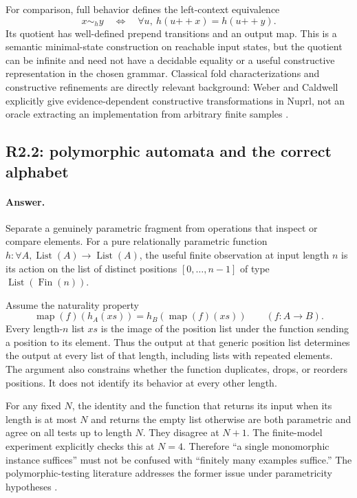 \documentclass[11pt,a4paper]{article}
\newcommand{\Fin}{\operatorname{Fin}}
\newcommand{\answer}{\paragraph{Answer.}}
\theoremstyle{definition}
\theoremstyle{remark}
\begin{document}
For comparison, full behavior defines the left-context equivalence
\[
 x\sim_h y\quad\Longleftrightarrow\quad
   \forall u,\ h(u\mathbin{++}x)=h(u\mathbin{++}y).
\]
Its quotient has well-defined prepend transitions and an output map. This is a
semantic minimal-state construction on reachable input states, but the quotient
can be infinite and need not have a decidable equality or a useful constructive
representation in the chosen grammar. Classical fold characterizations and
constructive refinements are directly relevant background: Weber and Caldwell
explicitly give evidence-dependent constructive transformations in Nuprl, not
an oracle extracting an implementation from arbitrary finite samples
\cite{gibbons,weber}.

\subsection{R2.2: polymorphic automata and the correct alphabet}
\answer Separate a genuinely parametric fragment from operations that inspect
or compare elements. For a pure relationally parametric function
$h:\forall A,\operatorname{List}(A)\to\operatorname{List}(A)$, the useful finite
observation at input length $n$ is its action on the list of distinct positions
$[0,\ldots,n-1]$ of type $\operatorname{List}(\Fin(n))$.

Assume the naturality property
\begin{equation}\label{eq:naturality}
 \operatorname{map}(f)(h_A(xs))
 =h_B(\operatorname{map}(f)(xs))
 \qquad(f:A\to B).
\end{equation}
Every length-$n$ list $xs$ is the image of the position list under the function
sending a position to its element. Thus the output at that generic position list
determines the output at every list of that length, including lists with repeated
elements. The argument also constrains whether the function duplicates, drops,
or reorders positions. It does not identify its behavior at every other length.

For any fixed $N$, the identity and the function that returns its input when
its length is at most $N$ and returns the empty list otherwise are both
parametric and agree on all tests up to length $N$. They disagree at $N+1$.
The finite-model experiment explicitly checks this at $N=4$. Therefore ``a
single monomorphic instance suffices'' must not be confused with ``finitely
many examples suffice.'' The polymorphic-testing literature addresses the
former issue under parametricity hypotheses \cite{polytesting}.
\end{document}
